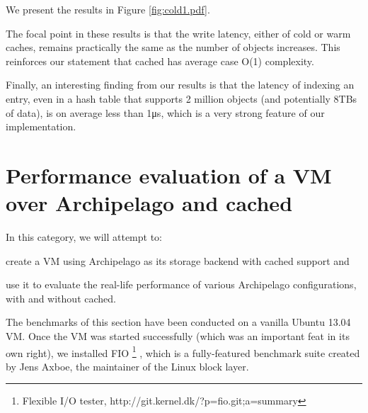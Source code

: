 We present the results in Figure \ref{fig:cold1.pdf}.


The focal point in these results is that the write latency, either of cold or 
warm caches, remains practically the same as the number of objects increases.  
This reinforces our statement that cached has average case O(1) complexity.

Finally, an interesting finding from our results is that the latency of 
indexing an entry, even in a hash table that supports 2 million objects (and 
potentially 8TBs of data), is on average less than 1μs, which is a very strong 
feature of our implementation.

\begin{comment}
As a side note, we observe a constant decrease in writelatency as the number of 
objects increase this is not something that should be attributed to our 
implementation. (explain that we have used a hash table that holds 2million 
objects, so it is not mapped to our process's address space. When more objects 
are indexed, the hash table becomes fuller and the latency of mmap()s is 
equally distributed to the objects. Else, the hash table is more scarce but the 
same blocks are hit, albeit not fully written, and thus the mmap latency is the 
same but distributed to less objects.)
\end{comment}

\section{Performance evaluation of a VM over Archipelago and cached}
\label{sec:vm-plot}

In this category, we will attempt to:
\begin{inparaenum}[i)]
	\item create a VM using Archipelago as its storage backend with cached 
		support	and
	\item use it to evaluate the real-life performance of various Archipelago 
		configurations, with and without cached.
\end{inparaenum}

The benchmarks of this section have been conducted on a vanilla Ubuntu 13.04 
VM. Once the VM was started successfully (which was an important feat in its 
own right), we installed FIO
\footnote{Flexible I/O tester, http://git.kernel.dk/?p=fio.git;a=summary}
, which is a fully-featured benchmark suite created by Jens Axboe, the 
maintainer of the Linux block layer.

